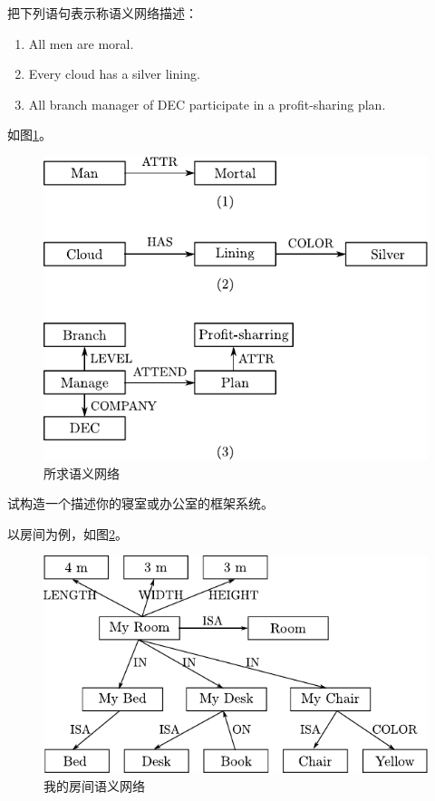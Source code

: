 \begin{question}
把下列语句表示称语义网络描述：
	\begin{enumerate}
		\item All men are moral.
		\item Every cloud has a silver lining.
		\item All branch manager of DEC participate in a profit-sharing plan. 
	\end{enumerate}
\end{question}
\begin{solution}
如图\ref{Fig:semantic-net}。
	\begin{figure}[h]
		\centering
		\includegraphics[scale=.9]{figures/ans-2.8.pdf}
		\caption{ 所求语义网络 } \label{Fig:semantic-net}
	\end{figure}
\end{solution}

\begin{question}
试构造一个描述你的寝室或办公室的框架系统。
\end{question}
\begin{solution}
以房间为例，如图\ref{Fig:semantic-my-room}。
	\begin{figure}[h]
		\centering
		\includegraphics[scale=.9]{figures/ans-2.9.pdf}
		\caption{ 我的房间语义网络 } \label{Fig:semantic-my-room}
	\end{figure}
\end{solution}

